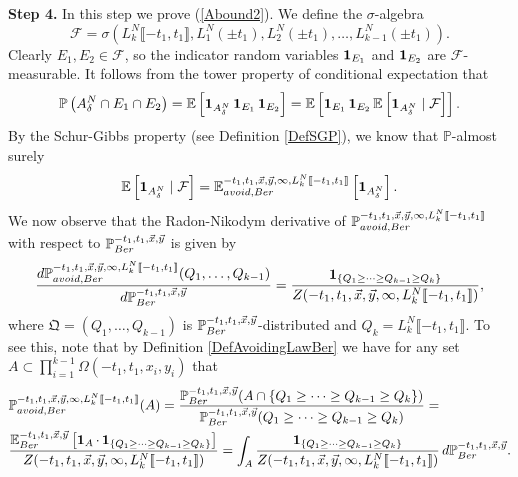 {\bf \raggedleft Step 4.} In this step we prove (\ref{Abound2}). We define the $\sigma$-algebra 
$$\mathcal{F}=\sigma\left(L_{k}^N \llbracket -t_1, t_1 \rrbracket ,L_1^N(\pm t_1 ), L_2^N(\pm t_1 ),\dots, L_{k-1}^N(\pm t_1 )\right).$$
Clearly $E_1, E_2\in \mathcal{F}$, so the indicator random variables $\operatorname{\mathbf{1}}_{E_1}$ and $\operatorname{\mathbf{1}}_{E_2}$ are $\mathcal{F}$-measurable. It follows from the tower property of conditional expectation that
\begin{equation}\label{tower}
\mathbb{P}\left(A^N_\delta\cap E_1\cap E_2\right)=\mathbb{E}\left[\operatorname{\mathbf{1}}_{A^N_\delta} \operatorname{\mathbf{1}}_{E_1} \operatorname{\mathbf{1}}_{E_2}\right] =\mathbb{E}\left[\operatorname{\mathbf{1}}_{E_1} \operatorname{\mathbf{1}}_{E_2}\mathbb{E}\left[\operatorname{\mathbf{1}}_{A^N_\delta}\mid \mathcal{F}\right]\right]. 
\end{equation}
By the Schur-Gibbs property (see Definition \ref{DefSGP}), we know that $\mathbb{P}$-almost surely
\begin{equation}\label{tower2}
\mathbb{E}\left[\operatorname{\mathbf{1}}_{A^N_\delta}\mid \mathcal{F}\right]=\mathbb{E}_{avoid,Ber}^{-t_1,t_1,\vec x, \vec y, \infty, L_{k}^N \llbracket -t_1, t_1 \rrbracket}\left[\operatorname{\mathbf{1}}_{A^N_\delta}\right].
\end{equation}
We now observe that the Radon-Nikodym derivative of $\mathbb{P}_{avoid,Ber}^{-t_1,t_1,\vec x, \vec y, \infty, L_{k}^N \llbracket -t_1, t_1 \rrbracket}$ with respect to $\mathbb{P}_{Ber}^{-t_1, t_1,\vec x,\vec y}$ is given by 
\begin{equation}\label{RN}
\frac{d\mathbb{P}_{avoid,Ber}^{-t_1,t_1,\vec x, \vec y, \infty, L_{k}^N\llbracket -t_1, t_1 \rrbracket } (Q_1, \dots, Q_{k-1})}{d\mathbb{P}_{Ber}^{-t_1, t_1,\vec x,\vec y}} = \frac{\operatorname{\mathbf{1}}_{\left\{Q_1 \geq \cdots \geq Q_{k-1} \geq Q_k \right\}}}{Z(-t_1,t_1,\vec x, \vec y, \infty,  L_{k}^N\llbracket -t_1, t_1 \rrbracket )},
\end{equation}
where $\mathfrak{Q} = (Q_1, \dots, Q_{k-1})$ is $\mathbb{P}_{Ber}^{-t_1, t_1,\vec x,\vec y}$-distributed and $Q_k = L_{k}^N\llbracket -t_1, t_1 \rrbracket$. To see this, note that by Definition \ref{DefAvoidingLawBer} we have for any set $A \subset  \prod_{i = 1}^{k-1}\Omega(-t_1, t_1, x_i, y_i )$ that 
\begin{equation*}
\begin{split}
&\mathbb{P}_{avoid,Ber}^{-t_1,t_1,\vec x, \vec y, \infty, L_{k}^N\llbracket -t_1, t_1 \rrbracket}(A) = \frac{\mathbb{P}_{Ber}^{-t_1,t_1,\vec x, \vec y}(A\cap\left\{Q_1 \geq \cdots \geq Q_{k-1} \geq Q_k\right\})}{\mathbb{P}_{Ber}^{-t_1,t_1,\vec x, \vec y}(Q_1\geq\cdots\geq Q_{k-1} \geq Q_k)} = \\
& \frac{\mathbb{E}_{Ber}^{-t_1,t_1,\vec x, \vec y}\left[\operatorname{\mathbf{1}}_A \cdot  \operatorname{\mathbf{1}}_{\left\{Q_1\geq\cdots\geq Q_{k-1} \geq Q_k \right\}}\right]}{Z(-t_1,t_1,\vec{x},\vec{y}, \infty, L^N_{k} \llbracket -t_1, t_1 \rrbracket)} = \int_A \frac{\operatorname{\mathbf{1}}_{\left\{Q_1\geq\cdots\geq Q_{k-1} \geq Q_k \right\}}}{Z(-t_1,t_1,\vec x, \vec y, \infty, L_{k}^N \llbracket -t_1, t_1 \rrbracket )}\,d\mathbb{P}_{Ber}^{-t_1,t_1,\vec x, \vec y}.
\end{split}
\end{equation*}

